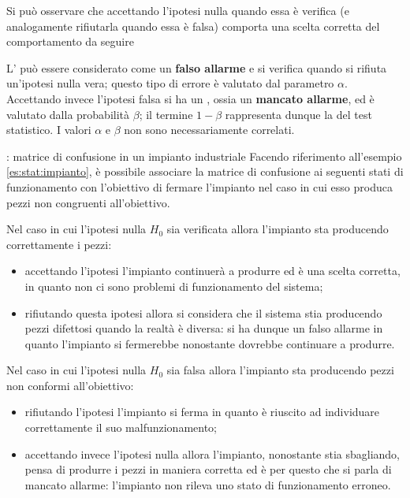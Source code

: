 	Si può osservare che accettando l'ipotesi nulla quando essa è verifica (e analogamente rifiutarla quando essa è falsa) comporta una scelta corretta del comportamento da seguire
	
	L' può essere considerato come un \textbf{falso allarme} e si verifica quando si rifiuta un'ipotesi nulla vera; questo tipo di errore è valutato dal parametro $\alpha$.	Accettando invece l'ipotesi falsa si ha un , ossia un \textbf{mancato allarme}, ed è valutato dalla probabilità $\beta$; il termine $1-\beta$ rappresenta dunque la  del test statistico. I valori $\alpha$ e $\beta$ non sono necessariamente correlati.
	
	\begin{esempio}{: matrice di confusione in un impianto industriale}
		Facendo riferimento all'esempio \ref{es:stat:impianto}, è possibile associare la matrice di confusione ai seguenti stati di funzionamento con l'obiettivo di fermare l'impianto nel caso in cui esso produca pezzi non congruenti all'obiettivo.
		
		Nel caso in cui l'ipotesi nulla $H_0$ sia verificata allora l'impianto sta producendo correttamente i pezzi:
		\begin{itemize}
			\item accettando l'ipotesi l'impianto continuerà a produrre ed è una scelta corretta, in quanto non ci sono problemi di funzionamento del sistema;
			\item rifiutando questa ipotesi allora si considera che il sistema stia producendo pezzi difettosi quando la realtà è diversa: si ha dunque un falso allarme in quanto l'impianto si fermerebbe nonostante dovrebbe continuare a produrre.
		\end{itemize}
	
		Nel caso in cui l'ipotesi nulla $H_0$ sia falsa allora l'impianto sta producendo pezzi non conformi all'obiettivo:
		\begin{itemize}
			\item rifiutando l'ipotesi l'impianto si ferma  in quanto è riuscito ad individuare correttamente il suo malfunzionamento;
			\item accettando invece l'ipotesi nulla allora l'impianto, nonostante stia sbagliando, pensa di produrre i pezzi in maniera corretta ed è per questo che si parla di mancato allarme: l'impianto non rileva uno stato di funzionamento erroneo.
		\end{itemize}
	\end{esempio}

